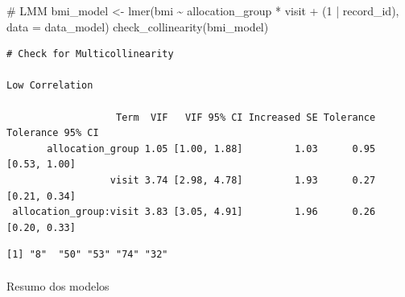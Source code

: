 \documentclass[
  12pt,
]{article}
\makeatletter
\let\oldparagraph\paragraph
\renewcommand{\paragraph}{
    \@ifstar
      \xxxParagraphStar
      \xxxParagraphNoStar
  }
\newcommand{\xxxParagraphStar}[1]{\oldparagraph*{#1}\mbox{}}
\newcommand{\xxxParagraphNoStar}[1]{\oldparagraph{#1}\mbox{}}
\newenvironment{Shaded}{\begin{snugshade}}{\end{snugshade}}
\newcommand{\AttributeTok}[1]{\textcolor[rgb]{0.40,0.45,0.13}{#1}}
\newcommand{\CommentTok}[1]{\textcolor[rgb]{0.37,0.37,0.37}{#1}}
\newcommand{\DecValTok}[1]{\textcolor[rgb]{0.68,0.00,0.00}{#1}}
\newcommand{\FunctionTok}[1]{\textcolor[rgb]{0.28,0.35,0.67}{#1}}
\newcommand{\NormalTok}[1]{\textcolor[rgb]{0.00,0.23,0.31}{#1}}
\newcommand{\OtherTok}[1]{\textcolor[rgb]{0.00,0.23,0.31}{#1}}
\newcommand{\SpecialCharTok}[1]{\textcolor[rgb]{0.37,0.37,0.37}{#1}}
\newcommand{\StringTok}[1]{\textcolor[rgb]{0.13,0.47,0.30}{#1}}
\makeatother
\begin{document}
\begin{Shaded}
\begin{Highlighting}[]
\CommentTok{\# LMM}
\NormalTok{bmi\_model }\OtherTok{\textless{}{-}} \FunctionTok{lmer}\NormalTok{(bmi }\SpecialCharTok{\textasciitilde{}}\NormalTok{ allocation\_group }\SpecialCharTok{*}\NormalTok{ visit }\SpecialCharTok{+} 
\NormalTok{(}\DecValTok{1} \SpecialCharTok{|}\NormalTok{ record\_id), }\AttributeTok{data =}\NormalTok{ data\_model)}
\FunctionTok{check\_collinearity}\NormalTok{(bmi\_model)}
\end{Highlighting}
\end{Shaded}

\begin{verbatim}
# Check for Multicollinearity

Low Correlation

                   Term  VIF   VIF 95% CI Increased SE Tolerance Tolerance 95% CI
       allocation_group 1.05 [1.00, 1.88]         1.03      0.95     [0.53, 1.00]
                  visit 3.74 [2.98, 4.78]         1.93      0.27     [0.21, 0.34]
 allocation_group:visit 3.83 [3.05, 4.91]         1.96      0.26     [0.20, 0.33]
\end{verbatim}

\begin{Shaded}
\end{Shaded}

\begin{verbatim}
[1] "8"  "50" "53" "74" "32"
\end{verbatim}

\paragraph{Resumo dos modelos}\label{resumo-dos-modelos-14}
\end{document}
